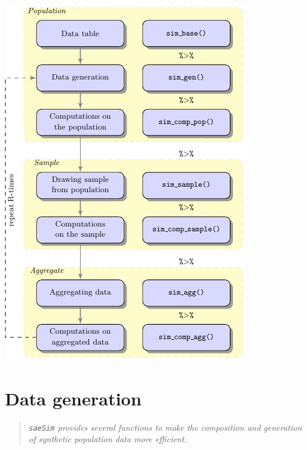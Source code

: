 \documentclass[a0,portrait]{a0poster}\usepackage[]{graphicx}\usepackage[]{color}
\newcommand{\mysec}[1]{\color{Black}\section*{#1}\color{DarkSlateGray}}
\newcommand{\inputR}[1]{}
\begin{document}
\begin{multicols}{2}
\begin{multicols}{2}[\setlength{\columnseprule}{0pt}]
\includegraphics[width=\linewidth]{figs/flowdiagram}

\end{multicols}


\mysec{Data generation}

\begin{verse}
\textit{\texttt{saeSim} provides several functions to make the composition and generation of synthetic population data more efficient.}
\end{verse}

\inputR{Rmd/dataGeneration}



\end{multicols}
\end{document}
